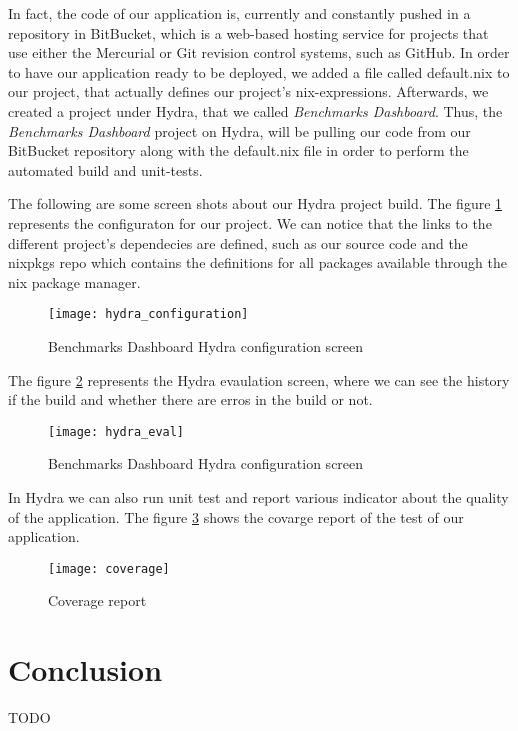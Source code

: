 In fact, the code of our application is, currently and constantly pushed in a
repository in BitBucket, which is a web-based hosting service for projects that
use either the Mercurial or Git revision control systems, such as GitHub. In
order to have our application ready to be deployed, we added a file called
default.nix to our project, that actually defines our project’s nix-expressions.
Afterwards, we created a project under Hydra, that we called \emph{Benchmarks
  Dashboard}. Thus, the \emph{Benchmarks Dashboard} project on Hydra, will be
pulling our code from our BitBucket repository along with the default.nix file
in order to perform the automated build and unit-tests.

The following are some screen shots about our Hydra project build. The figure
\hyperref[fig:hydra_configuration]{\ref{fig:hydra_configuration}}
represents the configuraton for our project. We can notice that the links to the
different project's dependecies are defined, such as our source code and the
nixpkgs repo which contains the definitions for all packages available through
the nix package manager.

\begin{figure}[h]
\texttt{[image: hydra\_configuration]}
\caption{Benchmarks Dashboard Hydra configuration screen}
\label{fig:hydra_configuration}
\end{figure}

The figure \hyperref[fig:hydra_eval]{\ref{fig:hydra_eval}} represents the Hydra
evaulation screen, where we can see the history if the build and whether there
are erros in the build or not.

\begin{figure}[h]
\texttt{[image: hydra\_eval]}
\caption{Benchmarks Dashboard Hydra configuration screen}
\label{fig:hydra_eval}
\end{figure}

In Hydra we can also run unit test and report various indicator about the
quality of the application. The figure
\hyperref[fig:coverage]{\ref{fig:coverage}} shows the covarge report of the test
of our application.

\begin{figure}[h]
\texttt{[image: coverage]}
\caption{Coverage report}
\label{fig:coverage}
\end{figure}

\section*{Conclusion}
TODO
